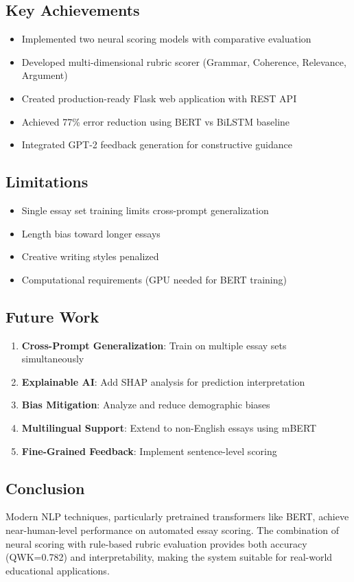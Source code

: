 \documentclass[12pt,a4paper]{article}
\begin{document}
\subsection{Key Achievements}
\begin{itemize}
    \item Implemented two neural scoring models with comparative evaluation
    \item Developed multi-dimensional rubric scorer (Grammar, Coherence, Relevance, Argument)
    \item Created production-ready Flask web application with REST API
    \item Achieved 77\% error reduction using BERT vs BiLSTM baseline
    \item Integrated GPT-2 feedback generation for constructive guidance
\end{itemize}

\subsection{Limitations}
\begin{itemize}
    \item Single essay set training limits cross-prompt generalization
    \item Length bias toward longer essays
    \item Creative writing styles penalized
    \item Computational requirements (GPU needed for BERT training)
\end{itemize}

\subsection{Future Work}
\begin{enumerate}
    \item \textbf{Cross-Prompt Generalization}: Train on multiple essay sets simultaneously
    \item \textbf{Explainable AI}: Add SHAP analysis for prediction interpretation
    \item \textbf{Bias Mitigation}: Analyze and reduce demographic biases
    \item \textbf{Multilingual Support}: Extend to non-English essays using mBERT
    \item \textbf{Fine-Grained Feedback}: Implement sentence-level scoring
\end{enumerate}

\subsection{Conclusion}
Modern NLP techniques, particularly pretrained transformers like BERT, achieve near-human-level performance on automated essay scoring. The combination of neural scoring with rule-based rubric evaluation provides both accuracy (QWK=0.782) and interpretability, making the system suitable for real-world educational applications.
\end{document}
